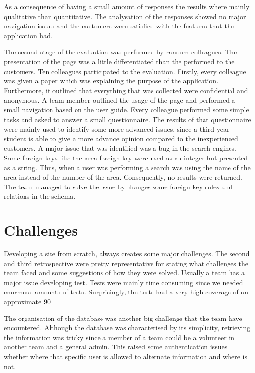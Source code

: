 \documentclass{l3proj}
\begin{document}
As a consequence of having a small amount of responses the results where mainly qualitative than quantitative. The analysation of the responses showed no major navigation issues and the customers were satisfied with the features that the application had.

The second stage of the evaluation was performed by random colleagues. The presentation of the page was a little differentiated than the performed to the customers. Ten colleagues participated to the evaluation. Firstly, every colleague was given a paper which was explaining the purpose of the application. Furthermore, it outlined that everything that was collected were confidential and anonymous. A team member outlined the usage of the page and performed a small navigation based on the user guide. Every colleague performed some simple tasks and asked to answer a small questionnaire. The results of that questionnaire were mainly used to identify some more advanced issues, since a third year student is able to give a more advance opinion compared to the inexperienced customers. A major issue that was identified was a bug in the search engines. Some foreign keys like the area foreign key were used as an integer but presented as a string. Thus, when a user was performing a search was using the name of the area instead of the number of the area. Consequently, no results were returned. The team managed to solve the issue by changes some foreign key rules and relations in the schema.




\section{Challenges}
\label{challenges}

Developing a site from scratch, always creates some major challenges. The second and third retrospective were pretty representative for stating what challenges the team faced and some suggestions of how they were solved. Usually a team has a major issue developing test. Tests were mainly time consuming since we needed enormous amounts of tests. Surprisingly, the tests had a very high coverage of an approximate 90%

The organisation of the database was another big challenge that the team have encountered. Although the database was characterised by its simplicity, retrieving the information was tricky since a member of a team could be a volunteer in another team and a general admin. This raised some authentication issues whether where that specific user is allowed to alternate information and where is not.
\end{document}
